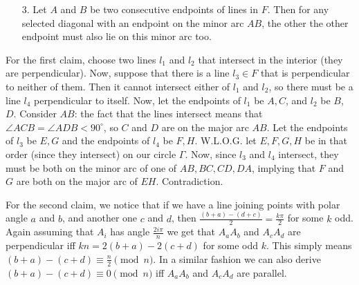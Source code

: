 \documentclass[11pt,a4paper]{article}
\begin{document}
\begin{itemize}
\begin{itemize}
\item [3.]
Let $A$ and $B$ be two consecutive endpoints of lines in $F$. 
Then for any selected diagonal with an endpoint on the minor arc $AB$, the other the other endpoint must also lie on this minor arc too.

\end{itemize}
For the first claim, choose two lines $l_1$ and $l_2$ that intersect in the interior (they are perpendicular). 
Now, suppose that there is a line $l_3\in F$ that is perpendicular to neither of them. 
Then it cannot intersect either of $l_1$ and $l_2$, so there must be a line $l_4$ perpendicular to itself. 
Now, let the endpoints of $l_1$ be $A, C$, and $l_2$ be $B$, $D$. 
Consider $AB$: the fact that the lines intersect means that $\angle ACB=\angle ADB <90^{\circ}$, so $C$ and $D$ are on the major arc $AB$. 
Let the endpoints of $l_3$ be $E, G$ and the endpoints of $l_4$ be $F, H$. 
W.L.O.G. let $E, F, G, H$ be in that order (since they intersect) on our circle $\Gamma$. 
Now, since $l_3$ and $l_4$ intersect, they must be both on the minor arc of one of $AB, BC, CD, DA$, 
implying that $F$ and $G$ are both on the major arc of $EH$. Contradiction. 

For the second claim, we notice that if we have a line joining points with polar angle $a$ and $b$, and another one $c$ and $d$, then 
$\frac{(b+a)-(d+c)}2=\frac{k\pi}2$ for some $k$ odd. 
Again assuming that $A_i$ has angle $\frac{2i\pi}{n}$ we get that $A_aA_b$ and $A_cA_d$ are perpendicular iff 
$kn=2(b+a)-2(c+d)$ for some odd $k$. 
This simply means $(b+a)-(c+d)\equiv \frac n2\pmod{n}$. 
In a similar fashion we can also derive $(b+a)-(c+d)\equiv 0\pmod{n}$ iff $A_aA_b$ and $A_cA_d$ are parallel. 


\end{itemize}
\end{document}
